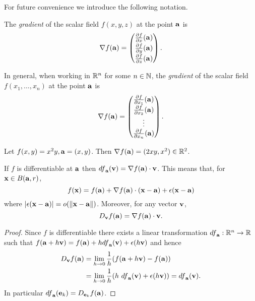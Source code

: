 For future convenience we introduce the following notation.
%
\begin{definition}[gradient]
    The \emph{gradient} of the scalar field \(f(x,y,z)\) at the point \(\aa\) is
    \[
        \nabla f(\aa) =
        \begin{pmatrix}
            \frac{\partial f}{\partial x}(\aa) \\[2pt]
            \frac{\partial f}{\partial y}(\aa) \\[2pt]
            \frac{\partial f}{\partial z}(\aa)
        \end{pmatrix}.
    \]
\end{definition}
%
\noindent
In general, when working in \(\bR^n\) for some \(n\in\bN\), the \emph{gradient} of the scalar field \(f(x_1,\ldots,x_n)\) at the point \(\aa\) is
\[
    \nabla f(\aa) =
    \begin{pmatrix}
        \frac{\partial f}{\partial x_1}(\aa) \\[2pt]
        \frac{\partial f}{\partial x_2}(\aa) \\[2pt]
        \vdots                               \\
        \frac{\partial f}{\partial x_n}(\aa)
    \end{pmatrix}.
\]

\begin{example}
 Let $f(x,y) = x^2 y, \aa = (x,y)$. Then $\nabla f(\aa) = (2xy, x^2) \in \bR^2$.
\end{example}



\begin{theorem}%
    \label{thm:differential}
    If \(f\) is differentiable at \(\aa\)
    then \({df}_{\aa}(\vv) = \nabla f(\aa) \cdot \vv \).
    This means that, for \(\xx \in B(\aa,r)\),
    \[
        f(\xx) = f(\aa) +   \nabla f(\aa) \cdot (\xx-\aa) + \epsilon(\xx-\aa)
    \]
    where \(\abs{\epsilon(\xx-\aa)} = \littleo{\norm{\xx-\aa}}\).
    Moreover, for any vector \(\vv\),
    \[
        D_{\vv}f(\aa) = \nabla f(\aa) \cdot \vv.
    \]
\end{theorem}

\begin{proof}
    Since \(f\) is differentiable there exists a linear transformation \({df}_{\aa}: \bR^n \to \bR\) such that
    \(  f(\aa+ h \vv) = f(\aa) + h {df}_{\aa}(\vv) + \epsilon(h\vv)\)
    and hence
    \[
        \begin{aligned}
            D_{\vv}f(\aa) & =
            \lim_{h\to 0} \frac{1}{h}(f(\aa+h \vv) - f(\aa)) \\
                          & =
            \lim_{h\to 0} \frac{1}{h}(h \ {df}_{\aa}(\vv) + \epsilon(h\vv) )
            =  {df}_{\aa}(\vv).
        \end{aligned}
    \]
    In particular \({df}_{\aa}(\ee_k) = D_{\ee_k}f(\aa)\).
\end{proof}


